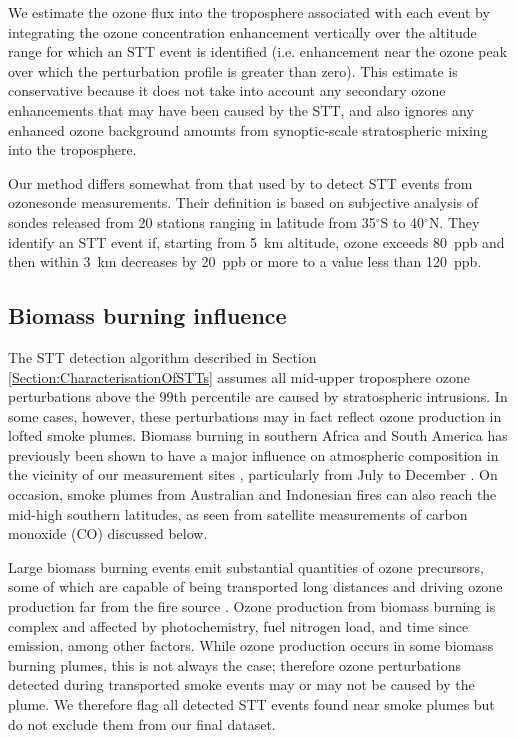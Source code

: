 \documentclass{article}
\begin{document}
    We estimate the ozone flux into the troposphere associated with each event by integrating the ozone concentration enhancement vertically over the altitude range for which an STT event is identified (i.e. enhancement near the ozone peak over which the perturbation profile is greater than zero).
    This estimate is conservative because it does not take into account any secondary ozone enhancements that may have been caused by the STT, and also ignores any enhanced ozone background amounts from synoptic-scale stratospheric mixing into the troposphere.
    
    Our method differs somewhat from that used by \citet{Tang2010} to detect STT events from ozonesonde measurements. 
    Their definition is based on subjective analysis of sondes released from 20 stations ranging in latitude from 35$^\circ$S to 40$^\circ$N.
    They identify an STT event if, starting from 5~km altitude, ozone exceeds 80~ppb and then within 3~km decreases by 20~ppb or more to a value less than 120~ppb.

  \subsection{Biomass burning influence}
  \label{Section:BiomassBurning}
    The STT detection algorithm described in Section \ref{Section:CharacterisationOfSTTs} assumes all mid-upper troposphere ozone perturbations above the 99th percentile are caused by stratospheric intrusions. 
    In some cases, however, these perturbations may in fact reflect ozone production in lofted smoke plumes.
    Biomass burning in southern Africa and South America has previously been shown to have a major influence on atmospheric composition in the vicinity of our measurement sites \citep{Oltmans2001, Gloudemans2006, Edwards2006}, particularly from July to December \citep{Pak2003, Liu2016}.
    On occasion, smoke plumes from Australian and Indonesian fires can also reach the mid-high southern latitudes, as seen from satellite measurements of carbon monoxide (CO) discussed below. %
    
    Large biomass burning events emit substantial quantities of ozone precursors, some of which are capable of being transported long distances and driving ozone production far from the fire source \citep{Jaffe_2012}.
    Ozone production from biomass burning is complex and affected by photochemistry, fuel nitrogen load, and time since emission, among other factors. 
    While ozone production occurs in some biomass burning plumes, this is not always the case; therefore ozone perturbations detected during transported smoke events may or may not be caused by the plume.
    We therefore flag all detected STT events found near smoke plumes but do not exclude them from our final dataset.
    
\end{document}
